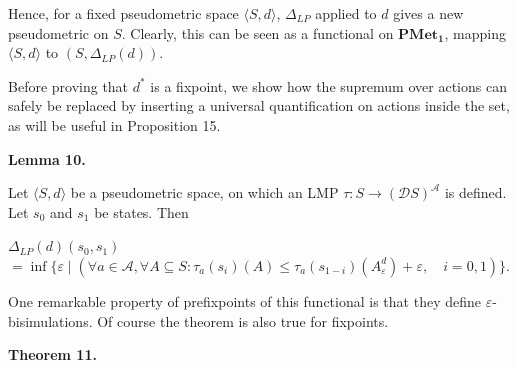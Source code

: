  
 
 
Hence, for a fixed pseudometric space $\langle S,d\rangle$, $\Delta_{LP}$ applied to $d$ gives a new pseudometric on $S$. Clearly, this can be seen as a functional on $\mathbf{PMet_{1}}$, mapping $\langle S,d\rangle$ to $(S,\Delta_{LP}(d))$.\par
 
 
 
Before proving that $d^{*}$ is a fixpoint, we show how the supremum over actions can safely be replaced by inserting a universal quantification on actions inside the set, as will be useful in Proposition 15.\par
 
 
 
\par\medskip\noindent\textbf{Lemma 10.}\par
 
 
Let $\langle S,d\rangle$ be a pseudometric space, on which an LMP $\tau:S\to(\mathcal{D}S)^{\mathcal{A}}$ is defined. Let $s_{0}$ and $s_{1}$ be states. Then\par
  
\par  \quad  $\displaystyle\Delta_{LP}(d)(s_{0},s_{1})$\quad  $\displaystyle=\inf\{\varepsilon\mid(\forall a\in\mathcal{A},\forall A\subseteq
S:\tau_{a}(s_{i})(A)\leq\tau_{a}(s_{1-i})(A^{d}_{\varepsilon})+\varepsilon,\quad i=0,1)\}.$\quad  \quad  
  
 
 
 
One remarkable property of prefixpoints of this functional is that they define $\varepsilon$-bisimulations. Of course the theorem is also true for fixpoints.\par
 
 
 
\par\medskip\noindent\textbf{Theorem 11.}\par
 
 

